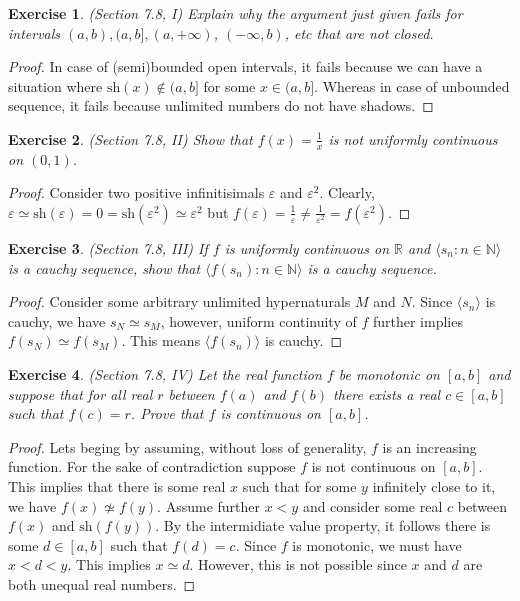 \documentclass[a4paper, 11pt, openany]{book}
\theoremstyle{plain}
\newtheorem{exercise}{Exercise}[chapter]
\theoremstyle{plain}
\newcommand{\N}{\mathbb{N}}
\newcommand{\R}{\mathbb{R}}
\newcommand{\la}{\langle}
\newcommand{\ra}{\rangle}
\newcommand{\ep}{\varepsilon}
\newcommand{\sh}{\text{sh}}
\begin{document}
  \begin{exercise}
    (Section 7.8, I)
    Explain why the argument just given fails for intervals $(a,b), (a, b], (a,+\infty)$, $(-\infty, b)$, etc that are not closed.
  \end{exercise}
  \begin{proof}
    In case of (semi)bounded open intervals, it fails because we can have a situation where $\sh(x) \notin (a,b]$ for some $x \in (a,b]$. Whereas in case of unbounded sequence, it fails because unlimited numbers do not have shadows.
  \end{proof}

  \begin{exercise}
    (Section 7.8, II)
    Show that $f(x)=\frac{1}{x}$ is not uniformly continuous on $(0,1)$.
  \end{exercise}
  \begin{proof}
    Consider two positive infinitisimals $\ep$ and $\ep^2$. Clearly, $\ep \simeq \sh(\ep)=0=\sh(\ep^2) \simeq \ep^2$ but $f(\ep)=\frac{1}{\ep} \not = \frac{1}{\ep^2}=f(\ep^2)$. 
  \end{proof}

  \begin{exercise}
    (Section 7.8, III)
    If $f$ is uniformly continuous on $\R$ and $\la s_n: n \in \N \ra$ is a cauchy sequence, show that $\la f(s_n): n \in \N \ra$ is a cauchy sequence.
  \end{exercise}
  \begin{proof}
    Consider some arbitrary unlimited hypernaturals $M$ and $N$. Since $\la s_n \ra$ is cauchy, we have $s_N \simeq s_M$, however, uniform continuity of $f$ further implies $f(s_N) \simeq f(s_M)$. This means $\la f(s_n) \ra$ is cauchy. 
  \end{proof}

  \begin{exercise}
    (Section 7.8, IV)
    Let the real function $f$ be monotonic on $[a,b]$ and suppose that for all real $r$ between $f(a)$ and $f(b)$ there exists a real $c \in [a,b]$ such that $f(c)=r$. Prove that $f$ is continuous on $[a,b]$.
  \end{exercise}
  \begin{proof}
    Lets beging by assuming, without loss of generality, $f$ is an increasing function. For the sake of contradiction suppose $f$ is not continuous on $[a,b]$. This implies that there is some real $x$ such that for some $y$ infinitely close to it, we have $f(x) \not \simeq f(y)$. Assume further $x<y$ and consider some real $c$ between $f(x)$ and $\sh(f(y))$. By the intermidiate value property, it follows there is some $d \in [a,b]$ such that $f(d)=c$. Since $f$ is monotonic, we must have $x<d<y$. This implies $x \simeq d$. However, this is not possible since $x$ and $d$ are both unequal real numbers.
  \end{proof}
\end{document}
